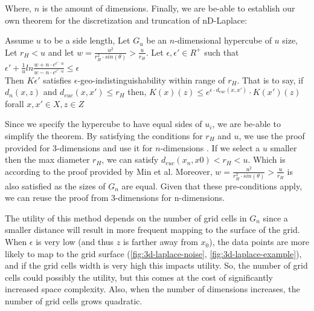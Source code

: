 Where, $n$ is the amount of dimensions. 
\newpage  
Finally, we are be-able to establish our own theorem for the discretization and truncation of nD-Laplace:
\begin{theorem}
    Assume $u$ to be a side length, Let $G_u$ be an $n$-dimensional hypercube of $u$ size, Let $r_H < u$ and let $w = \frac{u^2}{r^2_H \cdot sin (\theta)} > \frac{u}{r_H}.$ Let $\epsilon, \epsilon' \in R^+$ such that \\
    $\epsilon' + \frac{1}{u} ln \frac{w + n \cdot e^{\epsilon' \cdot u}}{w - n \cdot e^{\epsilon' \cdot u}} \leq \epsilon$ \\
    Then $K\epsilon'$ satisfies $\epsilon$-geo-indistinguishability within range
    of $r_H$. That is to say, if $d_n(x, z)$ and $d_{euc}(x, x') \leq r_H$ then, 
      $K(x)(z) \leq e^{\epsilon \cdot d_{euc} (x, x')} \cdot K(x')(z)$ forall $x, x' \in X, z \in Z$ \citep{chatzikokolakis_constructing_2015}
\end{theorem}
Since we specify the hypercube to have equal sides of $u_i$, we are be-able to simplify the theorem.
By satisfying the conditions for $r_H$ and $u$, we use the proof provided for 3-dimensions and use it for $n$-dimensions \citep{9646489}.
If we select a $u$ smaller then the max diameter $r_H$, we can satisfy $d_{euc}(x_n, x0) < r_H < u$. Which is according to the proof provided by Min et al.
Moreover, $w = \frac{u^2}{r_H^2 \cdot sin(\theta)} > \frac{u}{r_H}$ is also satisfied as the sizes of $G_n$ are equal. 
Given that these pre-conditions apply, we can reuse the proof from 3-dimensions for n-dimensions. \newline

The utility of this method depends on the number of grid cells in $G_n$ since a smaller distance will result in more frequent mapping to the surface of the grid.
When $\epsilon$ is very low (and thus $z$ is farther away from $x_0$), the data points are more likely to map to the grid surface (\ref{fig:3d-laplace-noise}, \ref{fig:3d-laplace-example}), and if the grid cells width is very high this impacts utility.
So, the number of grid cells could possibly the utility, but this comes at the cost of significantly increased space complexity. Also, when the number of dimensions increases, the number of grid cells grows quadratic. \newline

